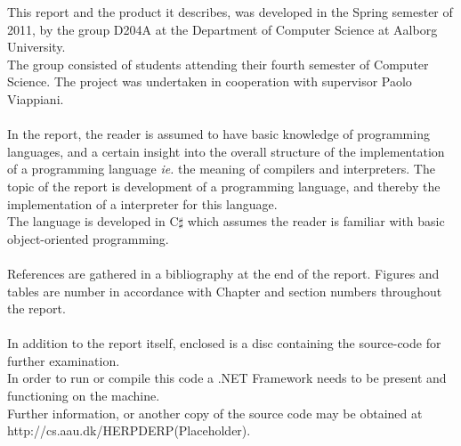 This report and the product it describes, was developed in the Spring semester of 2011, by the group D204A at the Department of Computer Science at Aalborg University. \\
The group consisted of students attending their fourth semester of Computer Science. The project was undertaken in cooperation with supervisor Paolo Viappiani. \\
\\
In the report, the reader is assumed to have basic knowledge of programming languages, and a certain insight into the overall structure of the implementation of a programming language \textit{ie.} the meaning of compilers and interpreters. The topic of the report is development of a programming language, and thereby the implementation of a interpreter for this language. \\
The language is developed in C$\sharp$ which assumes the reader is familiar with basic object-oriented programming. \\
\\
References are gathered in a bibliography at the end of the report. Figures and tables are number in accordance with Chapter and section numbers throughout the report. \\
\\
In addition to the report itself, enclosed is a disc containing the source-code for further examination. \\
In order to run or compile this code a .NET Framework needs to be present and functioning on the machine. \\
Further information, or another copy of the source code may be obtained at http://cs.aau.dk/HERPDERP(Placeholder).

\newpage\mbox{}\newpage